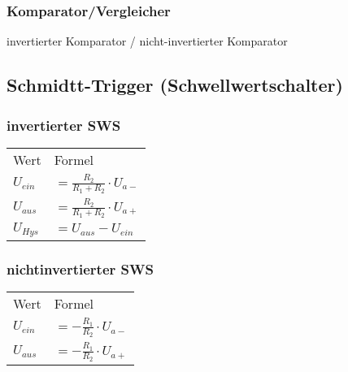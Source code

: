     \subsubsection{Komparator/Vergleicher}
        \begin{center}
            invertierter Komparator / nicht-invertierter Komparator
        \end{center}
\subsection{Schmidtt-Trigger (Schwellwertschalter)}
    \begin{minipage}[t][0.4\pdfpageheight][t]{0.5\columnwidth} %
        \subsubsection{invertierter SWS}
        \renewcommand{\arraystretch}{1.1}
        \begin{table}[H]
            \begin{tabularx}{\columnwidth}{l l}
                Wert      & Formel \\
                $U_{ein}$ & $=\frac{R_2}{R_1+R_2}\cdot U_{a-}$ \\
                $U_{aus}$ & $=\frac{R_2}{R_1+R_2}\cdot U_{a+}$ \\
                $U_{Hys}$ & $=U_{aus}-U_{ein}$
            \end{tabularx}
        \end{table}
    \end{minipage}
    \begin{minipage}[t][0.4\pdfpageheight][t]{0.5\columnwidth}
        \subsubsection{nichtinvertierter SWS}
        \renewcommand{\arraystretch}{1.1}
        \begin{table}[H]
            \begin{tabularx}{\columnwidth}{l l}
                Wert      & Formel \\
                $U_{ein}$ & $=-\frac{R_1}{R_2}\cdot U_{a-}$ \\
                $U_{aus}$ & $=-\frac{R_1}{R_2}\cdot U_{a+}$ \\
            \end{tabularx}
        \end{table}
    \end{minipage}
